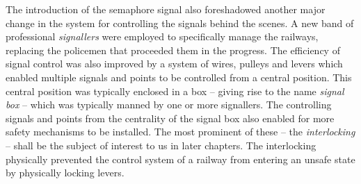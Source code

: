 \begin{comment}
One of the major developments in railway signalling was the introduction of
the \textbf{Semaphore} fixed signal. These consisted of a board that could be
moved into several preset positions. Typically these would have  3 different visible
``aspects'' which they could be set to: One aspect to indicate the driver can
proceed, another that indicates the driver can proceed with caution and
finally an aspect which indicates that the driver should stop. 
\end{comment}

The introduction of the semaphore signal also foreshadowed another major change in the system for controlling the signals behind the scenes.  A new band of professional \emph{signallers} were employed to specifically manage the railways, replacing the policemen that proceeded them in the progress. The efficiency of signal control was also improved by a system of wires, pulleys and levers which enabled multiple signals and points to be controlled from a central position. This central position was typically enclosed in a box -- giving rise to the name \emph{signal box} -- which was typically manned by one or more signallers. The controlling signals and points from the centrality of the signal box also enabled for more safety mechanisms to be installed. The most prominent of these -- the \emph{interlocking}  -- shall be the subject of interest to us in later chapters. The interlocking physically prevented the control system of a railway from entering an unsafe state by physically locking levers.


